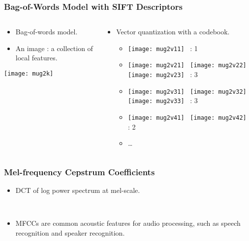 \documentclass{beamer}
\begin{document}
\begin{frame}
  \frametitle{Bag-of-Words Model with SIFT Descriptors}

  \begin{columns}
    \begin{column}{.46\linewidth}
      \begin{itemize}
        \item Bag-of-words model. 
        \item An image : a collection of local features.
      \end{itemize}
      \centering
      \texttt{[image: mug2k]}
    \end{column}

    \begin{column}{.46\linewidth}
      \begin{itemize}
        \item Vector quantization with a codebook.
          \begin{itemize}
            \item
              \texttt{[image: mug2v11]}~ : 1
            \item
              \texttt{[image: mug2v21]}~
              \texttt{[image: mug2v22]}~
              \texttt{[image: mug2v23]}~ : 3
            \item
              \texttt{[image: mug2v31]}~
              \texttt{[image: mug2v32]}~
              \texttt{[image: mug2v33]}~ : 3
            \item
              \texttt{[image: mug2v41]}~
              \texttt{[image: mug2v42]}~ : 2
            \item \ldots
          \end{itemize}
      \end{itemize}
    \end{column}
  \end{columns}
\end{frame}

\begin{frame}
  \frametitle{Mel-frequency Cepstrum Coefficients}

  \begin{itemize}
    \item DCT of log power spectrum at mel-scale.

      ~
    \item MFCCs are common acoustic features for audio processing, such as speech recognition and speaker recognition.
  \end{itemize}
\end{frame}
\end{document}
